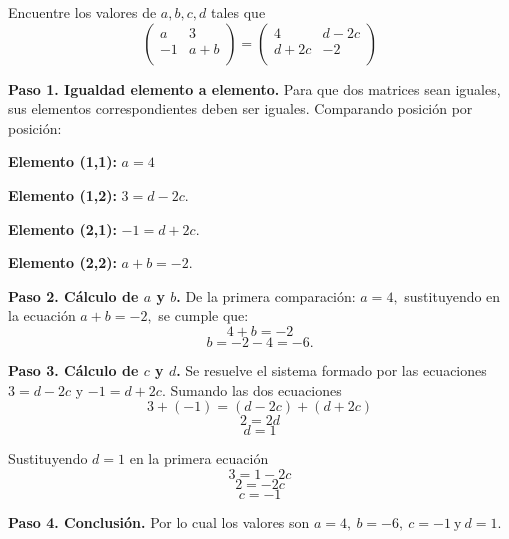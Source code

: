 \begin{prob} 
Encuentre los valores de $a,b,c,d$ tales que 
$$\left( \begin{array}{cc}
a&3\\
-1&a+b\\
\end{array} \right)=\left( \begin{array}{cc}
4&d-2c\\
d+2c&-2\\
\end{array} \right)$$

\begin{myproof}
\textbf{Paso 1. Igualdad elemento a elemento.} Para que dos matrices sean iguales, sus elementos correspondientes deben ser iguales. Comparando posición por posición:

\textbf{Elemento (1,1):} $a = 4$

\textbf{Elemento (1,2):} $3 = d - 2c.$

\textbf{Elemento (2,1):} $-1 = d + 2c.$

\textbf{Elemento (2,2):} $a + b = -2.$

\textbf{Paso 2. Cálculo de $a$ y $b$.} De la primera comparación: $a = 4,$ sustituyendo en la ecuación $a + b = -2,$ se cumple que:
$$4 + b = -2$$
$$b = -2 - 4 = -6.$$

\textbf{Paso 3. Cálculo de $c$ y $d$.} Se resuelve el sistema formado por las ecuaciones $3 = d - 2c$ y $-1 = d + 2c.$ Sumando las dos ecuaciones
$$3 + (-1) = (d - 2c) + (d + 2c)$$
$$2 = 2d$$
$$d = 1$$

Sustituyendo $d = 1$ en la primera ecuación
$$3 = 1 - 2c$$
$$2 = -2c$$
$$c = -1$$

\textbf{Paso 4. Conclusión.} Por lo cual los valores son $\boxed{a=4,\ b=-6,\ c=-1\ \text{y}\ d=1}.$
\end{myproof}
\end{prob}



